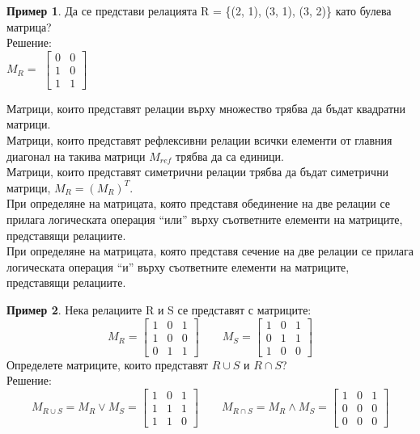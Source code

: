 \documentclass[fleqn, 12pt]{article}
\theoremstyle{definition}
\newtheorem{example}{Пример}[subsection]
\begin{document}
\begin{example}
Да се представи релацията R = \{(2, 1), (3, 1), (3, 2)\} като булева матрица? \\
Решение: \\
$M_R = $
$\left[
\begin{matrix}
0 & 0\\
1 & 0\\
1 & 1
\end{matrix}
\right]$
\end{example}
Матрици, които представят релации върху множество трябва да бъдат квадратни матрици.\\
Матрици, които представят рефлексивни релации всички елементи от главния диагонал на такива матрици $M_{ref}$ трябва да са единици.\\
Матрици, които представят симетрични релации трябва да бъдат симетрични матрици, $M_R= (M_R)^T$.\\
При определяне на матрицата, която представя обединение на две релации се прилага логическата операция “или” върху съответните елементи на матриците, представящи релациите.\\
При определяне на матрицата, която представя сечение на две релации се прилага логическата операция “и” върху съответните елементи на матриците, представящи релациите. \\
\begin{example}
Нека релациите R и S се представят с матриците:
$$
M_R = 
\left[
\begin{matrix}
1 & 0 & 1\\
1 & 0 & 0\\
0 & 1 & 1
\end{matrix}
\right]
\qquad 
M_S = 
\left[
\begin{matrix}
1 & 0 & 1\\
0 & 1 & 1\\
1 & 0 & 0
\end{matrix}
\right]
$$
Определете матриците, които представят $R \cup S$ и $R \cap S$? \\
Решение: \\
$$
M_{R \cup S} = M_R \lor M_S = 
\left[
\begin{matrix}
1 & 0 & 1\\
1 & 1 & 1\\
1 & 1 & 0
\end{matrix}
\right]
\qquad
M_{R \cap S} = M_R \land M_S =
\left[
\begin{matrix}
1 & 0 & 1\\
0 & 0 & 0\\
0 & 0 & 0
\end{matrix}
\right]
$$
\end{example}
\end{document}
